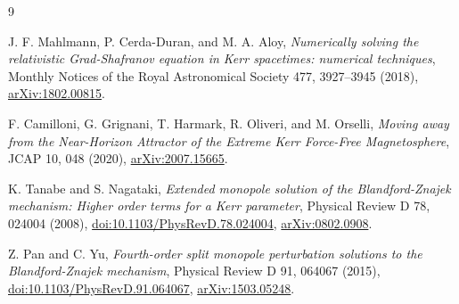 \documentclass[11pt]{article}
\begin{document}
\begin{thebibliography}{9}

J. F. Mahlmann, P. Cerda-Duran, and M. A. Aloy,
\emph{Numerically solving the relativistic Grad-Shafranov equation in Kerr
spacetimes: numerical techniques},
Monthly Notices of the Royal Astronomical Society 477, 3927--3945 (2018),
\href{https://arxiv.org/abs/1802.00815}{arXiv:1802.00815}.

F. Camilloni, G. Grignani, T. Harmark, R. Oliveri, and M. Orselli,
\emph{Moving away from the Near-Horizon Attractor of the Extreme Kerr
Force-Free Magnetosphere},
JCAP 10, 048 (2020),
\href{https://arxiv.org/abs/2007.15665}{arXiv:2007.15665}.

K. Tanabe and S. Nagataki,
\emph{Extended monopole solution of the Blandford-Znajek mechanism: Higher
order terms for a Kerr parameter},
Physical Review D 78, 024004 (2008),
\href{https://doi.org/10.1103/PhysRevD.78.024004}{doi:10.1103/PhysRevD.78.024004},
\href{https://arxiv.org/abs/0802.0908}{arXiv:0802.0908}.

Z. Pan and C. Yu,
\emph{Fourth-order split monopole perturbation solutions to the
Blandford-Znajek mechanism},
Physical Review D 91, 064067 (2015),
\href{https://doi.org/10.1103/PhysRevD.91.064067}{doi:10.1103/PhysRevD.91.064067},
\href{https://arxiv.org/abs/1503.05248}{arXiv:1503.05248}.

\end{thebibliography}
\end{document}

